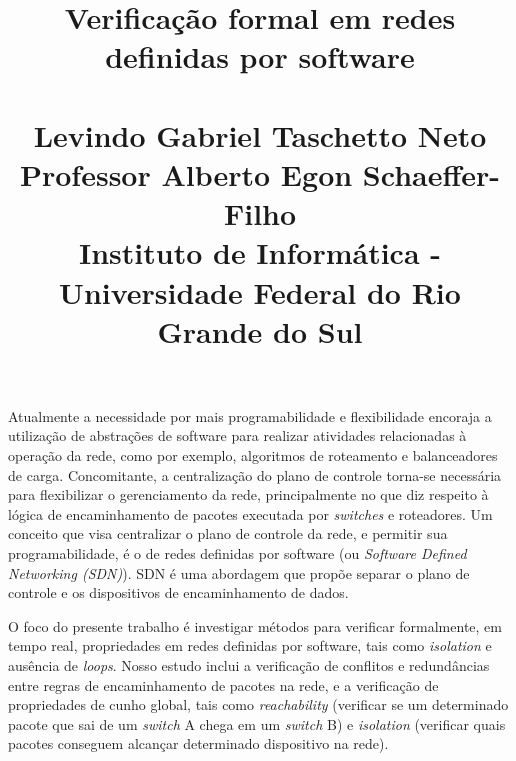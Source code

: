 \documentclass[a4paper,12pt,twoside]{article}
\title{
Verificação formal em redes definidas por software \\ ~ \\
\normalsize Levindo Gabriel Taschetto Neto \\ Professor Alberto Egon Schaeffer-Filho \\
\small Instituto de Informática - Universidade Federal do Rio Grande do Sul
}
\date{}
\begin{document}
\maketitle
\vspace{-1.7cm}







\thispagestyle{empty}
Atualmente a necessidade por mais programabilidade e flexibilidade encoraja a utilização de abstrações de software para realizar atividades relacionadas à operação da rede, como por exemplo, algoritmos de roteamento e balanceadores de carga.
Concomitante, a centralização do plano de controle torna-se necessária para flexibilizar o gerenciamento da rede, principalmente no que diz respeito à lógica de encaminhamento de pacotes executada por \textit{switches} e roteadores. Um conceito que visa centralizar o plano de controle da rede, e permitir sua programabilidade, é o de redes definidas por software (ou \textit{Software Defined Networking (SDN)}). SDN é uma abordagem que propõe separar o plano de controle e os dispositivos de encaminhamento de dados.

O foco do presente trabalho é investigar métodos para verificar formalmente, em tempo real, propriedades em redes definidas por software, tais como \textit{isolation} e ausência de \textit{loops}.
Nosso estudo inclui a verificação de conflitos e redundâncias entre regras de encaminhamento de pacotes na rede, e a verificação de propriedades de cunho global, tais como \textit{reachability} (verificar se um determinado pacote que sai de um \textit{switch} A chega em um \textit{switch} B) e \textit{isolation} (verificar quais pacotes conseguem alcançar determinado dispositivo na rede).
\end{document}
